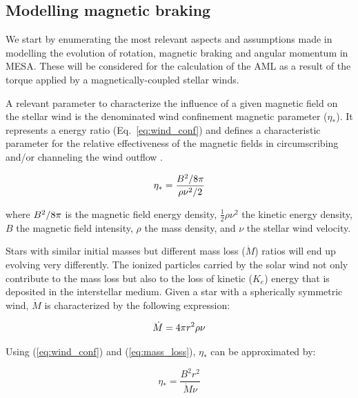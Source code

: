 \documentclass[fleqn,usenatbib]{mnras}
\begin{document}
\subsection{Modelling magnetic braking} \label{mod_mb}
We start by enumerating the most relevant aspects and assumptions made in modelling the evolution of rotation, magnetic braking and angular momentum in MESA. These will be considered for the calculation of the AML as a result of the torque applied by a magnetically-coupled stellar winds.\par 

A relevant parameter to characterize the influence of a given magnetic field on the stellar wind is the denominated wind confinement magnetic parameter ($\eta_*$). It represents a energy ratio (Eq.~\ref{eq:wind_conf}) and defines a characteristic parameter for the relative effectiveness of the magnetic fields in circumscribing and/or channeling the wind outflow \citep{UdDoula2002}.\par

\begin{ceqn}
\begin{equation}
    \eta_* = \frac{B^{2}/8\pi}{\rho\nu^2/2} \label{eq:wind_conf}
\end{equation}
\end{ceqn}

where $B^{2}/8\pi$ is the magnetic field energy density, $\frac{1}{2}\rho\nu^{2}$ the kinetic energy density, $B$ the magnetic field intensity, $\rho$ the mass density, and $\nu$ the stellar wind velocity.\par

Stars with similar initial masses but different mass loss ($\Dot{M}$) ratios will end up evolving very differently. The ionized particles carried by the solar wind not only contribute to the mass loss but also to the loss of kinetic ($K_e$) energy that is deposited in the interstellar medium. Given a star with a spherically symmetric wind, $\Dot{M}$ is characterized by the following expression:

\begin{ceqn}
\begin{equation}
    \Dot{M} = 4\pi r^2\rho\nu \label{eq:mass_loss}
\end{equation}
\end{ceqn}

Using (\ref{eq:wind_conf}) and (\ref{eq:mass_loss}), $\eta_*$ can be approximated by: 
\begin{ceqn}
\begin{equation}
    \eta_* = \frac{B^{2}r^{2}}{\Dot{M}\nu} \label{eq:wind_conf2}
\end{equation}
\end{ceqn}
\end{document}
